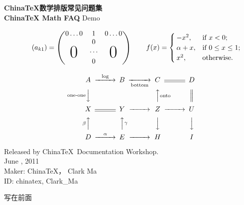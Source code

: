 \documentclass{article}
\makeatletter
\newcommand*{\Headline}[1]{\@mkboth{#1}{#1}}%
\makeatother
\begin{document}
\begin{titlepage}
\begin{center}
\textbf{\Huge \textcolor[rgb]{0.00390625, 0.43359375,0.77734375}{\qquad China\TeX{}}数学排版常见问题集}\\[\baselineskip]
\Huge \textbf{\textcolor[rgb]{0.00390625, 0.43359375,0.77734375}{\qquad China\TeX{}} %
Math {\color{red}F}A\color{lightblue}Q} Demo
\vskip 3cm
\end{center}
\newcommand{\BigFig}[1]{\parbox{12pt}{\Huge #1}}
\newcommand{\BigZero}{\BigFig{0}}
\begin{equation*}
\qquad(a_{k1})=\left(
\begin{matrix}
0\ldots 0 & 1 & 0\ldots 0\\
& 0\\
\BigZero & \cdots & \BigZero\\
& 0\\
\end{matrix}
\right)
\qquad
f(x)=
\begin{cases}
-x^{2},
&\text{if $x < 0$;}\\
\alpha + x,
&\text{if $0 \leq x \leq 1$;}\\
x^{2},
&\text{otherwise.}
\end{cases}
\end{equation*}

\vskip 1cm

\[
\qquad\quad\begin{CD}
A @>\log>> B @>>\text{bottom}> C @= D \\
@V\text{one-one}VV @. @AA\text{onto}A @|\\
X @= Y @>>> Z @>>> U\\
@A\beta AA @AA\gamma A @VVV @VVV\\
D @>\alpha>> E @>>> H @. I\\
\end{CD}
\]


\vskip 3cm
\begin{flushright}
\begin{minipage}{.7\textwidth}
\flushright
\hrulefill

Released by China\TeX\ Documentation Workshop.\\
June , 2011\\
Maker: China\TeX ， Clark Ma\\
ID: chinatex, Clark\_Ma\\
\hrulefill
\end{minipage}
\end{flushright}

\end{titlepage}
\pagecolor{white}
\Headline{写在前面}
\begin{center}
{\Large{} 写在前面}
\end{center}
{}
\end{document}
